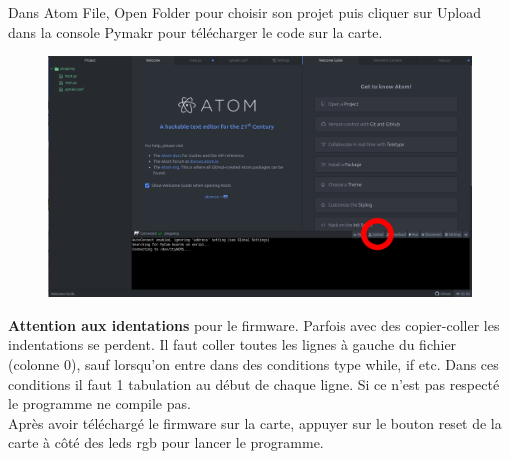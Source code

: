 \documentclass{article}
\begin{document}
Dans Atom File, Open Folder pour choisir son projet puis cliquer sur Upload dans la console Pymakr pour télécharger le  code sur la carte. \\



\begin{figure}[H]
\begin{center}
\advance\leftskip-3cm
\advance\rightskip-3cm
\includegraphics[keepaspectratio=true,scale=0.3]{atom_upload.png}
\label{visina8}
\end{center}\end{figure}

\textbf{Attention aux identations} pour le firmware. Parfois avec des copier-coller les indentations se perdent.
Il faut coller toutes les lignes à gauche du fichier (colonne 0), sauf lorsqu'on entre dans des conditions type while, if etc. Dans ces conditions il faut 1 tabulation au début de chaque ligne.
Si ce n'est pas respecté le programme ne compile pas. \\


Après avoir téléchargé le firmware sur la carte, appuyer sur le bouton reset de la carte à côté des leds rgb pour lancer le programme.
\end{document}
